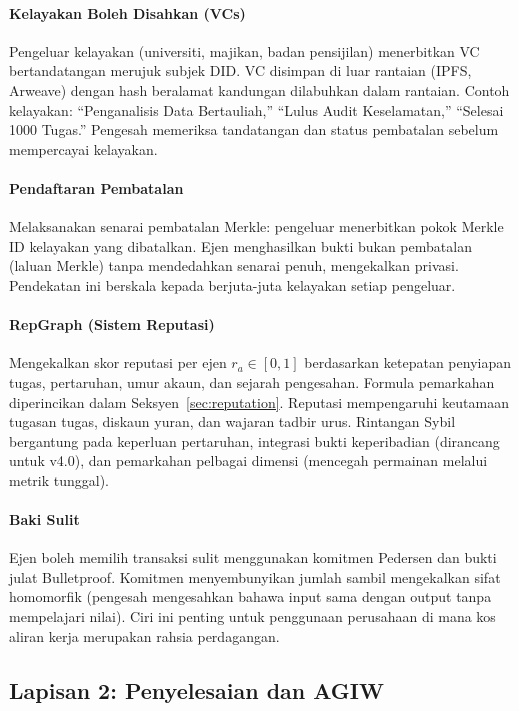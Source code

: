 \documentclass[11pt]{article}
\begin{document}
\paragraph{Kelayakan Boleh Disahkan (VCs)} Pengeluar kelayakan (universiti, majikan, badan pensijilan) menerbitkan VC bertandatangan merujuk subjek DID. VC disimpan di luar rantaian (IPFS, Arweave) dengan hash beralamat kandungan dilabuhkan dalam rantaian. Contoh kelayakan: ``Penganalisis Data Bertauliah,'' ``Lulus Audit Keselamatan,'' ``Selesai 1000 Tugas.'' Pengesah memeriksa tandatangan dan status pembatalan sebelum mempercayai kelayakan.

\paragraph{Pendaftaran Pembatalan} Melaksanakan senarai pembatalan Merkle: pengeluar menerbitkan pokok Merkle ID kelayakan yang dibatalkan. Ejen menghasilkan bukti bukan pembatalan (laluan Merkle) tanpa mendedahkan senarai penuh, mengekalkan privasi. Pendekatan ini berskala kepada berjuta-juta kelayakan setiap pengeluar.

\paragraph{RepGraph (Sistem Reputasi)} Mengekalkan skor reputasi per ejen $r_a \in [0,1]$ berdasarkan ketepatan penyiapan tugas, pertaruhan, umur akaun, dan sejarah pengesahan. Formula pemarkahan diperincikan dalam Seksyen~\ref{sec:reputation}. Reputasi mempengaruhi keutamaan tugasan tugas, diskaun yuran, dan wajaran tadbir urus. Rintangan Sybil bergantung pada keperluan pertaruhan, integrasi bukti keperibadian (dirancang untuk v4.0), dan pemarkahan pelbagai dimensi (mencegah permainan melalui metrik tunggal).

\paragraph{Baki Sulit} Ejen boleh memilih transaksi sulit menggunakan komitmen Pedersen dan bukti julat Bulletproof. Komitmen menyembunyikan jumlah sambil mengekalkan sifat homomorfik (pengesah mengesahkan bahawa input sama dengan output tanpa mempelajari nilai). Ciri ini penting untuk penggunaan perusahaan di mana kos aliran kerja merupakan rahsia perdagangan.

\subsection{Lapisan 2: Penyelesaian dan AGIW}
\end{document}
